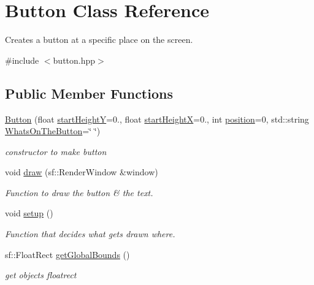 \hypertarget{class_button}{}\section{Button Class Reference}
\label{class_button}


Creates a button at a specific place on the screen.  




{\ttfamily \#include $<$button.\+hpp$>$}

\subsection*{Public Member Functions}
\begin{DoxyCompactItemize}
\item 
\hyperlink{class_button_a1085aea4e01df12c1400d2f2f666dda2}{Button} (float \hyperlink{class_button_afe532ea0d5dd3fea5341ba1cb3e64e0b}{start\+HeightY}=0., float \hyperlink{class_button_a954fb7025b688b7b2a4d8d16adca74eb}{start\+HeightX}=0., int \hyperlink{class_button_a6853c434f05010c4b2582fb757f96bef}{position}=0, std\+::string \hyperlink{class_button_a960b5ee6c11f9385763838b1d788f010}{Whats\+On\+The\+Button}=\char`\"{} \char`\"{})
\begin{DoxyCompactList}\small\item\em constructor to make button \end{DoxyCompactList}\item 
void \hyperlink{class_button_adf65892636ea303a84e1391106ea7cb0}{draw} (sf\+::\+Render\+Window \&window)
\begin{DoxyCompactList}\small\item\em Function to draw the button \& the text. \end{DoxyCompactList}\item 
void \hyperlink{class_button_aaf14334dd0ac6a9c286aac71a765caa2}{setup} ()
\begin{DoxyCompactList}\small\item\em Function that decides what gets drawn where. \end{DoxyCompactList}\item 
sf\+::\+Float\+Rect \hyperlink{class_button_af662f717b2230477da7d4760293473d4}{get\+Global\+Bounds} ()
\begin{DoxyCompactList}\small\item\em get objects floatrect \end{DoxyCompactList}\end{DoxyCompactItemize}
